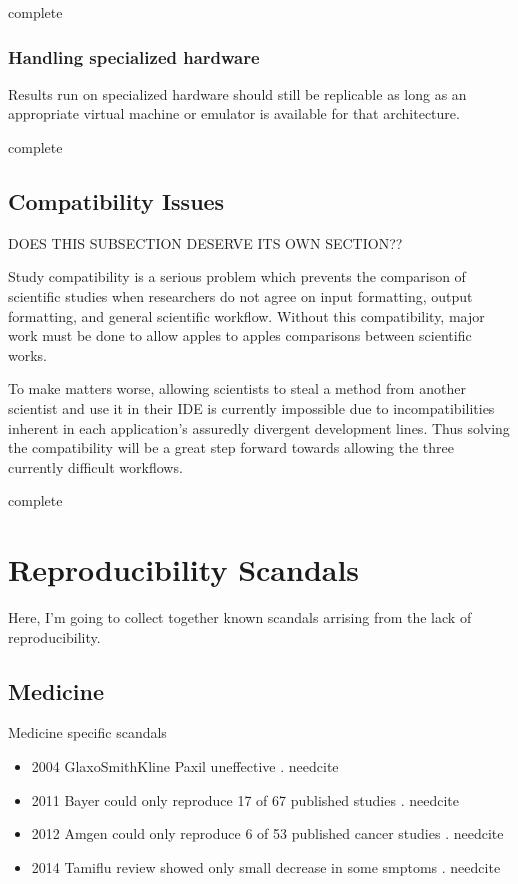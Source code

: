 \documentclass[american]{article}
\newcommand{\complete}{
	\gls{complete}
}
\newcommand{\needcite}{
	\gls{needcite}
}
\begin{document}
\complete

\subsubsection{Handling specialized hardware}

Results run on specialized hardware should still be replicable as long as an appropriate virtual machine or emulator is available for that architecture.

\complete

\subsection{Compatibility Issues}

DOES THIS SUBSECTION DESERVE ITS OWN SECTION??

Study compatibility is a serious problem which prevents the comparison of scientific studies when researchers do not agree on input formatting, output formatting, and general scientific workflow. Without this compatibility, major work must be done to allow apples to apples comparisons between scientific works.

To make matters worse, allowing scientists to steal a method from another scientist and use it in their IDE is currently impossible due to incompatibilities inherent in each application's assuredly divergent development lines. Thus solving the compatibility will be a great step forward towards allowing the three currently difficult workflows.

\complete

\section{Reproducibility Scandals}

Here, I'm going to collect together known scandals arrising from the lack of reproducibility.

\subsection{Medicine}

Medicine specific scandals

\begin{itemize}
\item 2004 GlaxoSmithKline Paxil uneffective \cite{dhb-zurich-hp}. \needcite
\item 2011 Bayer could only reproduce 17 of 67 published studies \cite{dhb-zurich-hp}. \needcite
\item 2012 Amgen could only reproduce 6 of 53 published cancer studies \cite{dhb-zurich-hp}. \needcite
\item 2014 Tamiflu review showed only small decrease in some smptoms \cite{dhb-zurich-hp}. \needcite
\end{itemize}
\end{document}
